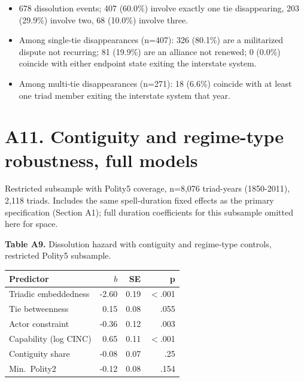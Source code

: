 \documentclass[Afour,sageh,times,doublespace]{sagej}
\begin{document}
\begin{itemize}
\item 678 dissolution events; 407 (60.0\%) involve exactly one tie disappearing, 203 (29.9\%) involve two, 68 (10.0\%) involve three.
\item Among single-tie disappearances (n=407): 326 (80.1\%) are a militarized dispute not recurring; 81 (19.9\%) are an alliance not renewed; 0 (0.0\%) coincide with either endpoint state exiting the interstate system.
\item Among multi-tie disappearances (n=271): 18 (6.6\%) coincide with at least one triad member exiting the interstate system that year.
\end{itemize}

\section*{A11. Contiguity and regime-type robustness, full models}

Restricted subsample with Polity5 coverage, n=8,076 triad-years (1850-2011), 2,118 triads. Includes the same spell-duration fixed effects as the primary specification (Section A1); full duration coefficients for this subsample omitted here for space.

\begin{table}[t]
\centering
\textbf{Table A9.} Dissolution hazard with contiguity and regime-type controls, restricted Polity5 subsample.

\vspace{4pt}
{\small\sf
\begin{tabular}{lrrr}
\toprule
Predictor & $b$ & SE & p\\
\midrule
Triadic embeddedness & -2.60 & 0.19 & $<$.001\\
Tie betweenness & 0.15 & 0.08 & .055\\
Actor constraint & -0.36 & 0.12 & .003\\
Capability (log CINC) & 0.65 & 0.11 & $<$.001\\
Contiguity share & -0.08 & 0.07 & .25\\
Min.\ Polity2 & -0.12 & 0.08 & .154\\
\bottomrule
\end{tabular}
\par}
\end{table}
\end{document}
